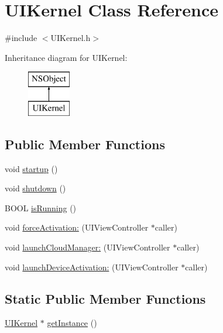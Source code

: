 \hypertarget{interface_u_i_kernel}{
\section{\-U\-I\-Kernel \-Class \-Reference}
\label{interface_u_i_kernel}
}


{\ttfamily \#include $<$\-U\-I\-Kernel.\-h$>$}

\-Inheritance diagram for \-U\-I\-Kernel\-:\begin{figure}[H]
\begin{center}
\leavevmode
\includegraphics[height=2.000000cm]{interface_u_i_kernel}
\end{center}
\end{figure}
\subsection*{\-Public \-Member \-Functions}
\begin{DoxyCompactItemize}
\item 
void \hyperlink{interface_u_i_kernel_acacf4a426cf59fae1d5c64ddf3e0eca5}{startup} ()
\item 
void \hyperlink{interface_u_i_kernel_aa87848b5862041cfe4af17fa9ea80194}{shutdown} ()
\item 
\-B\-O\-O\-L \hyperlink{interface_u_i_kernel_a12b1b335a7feb23e72621a289fcc7354}{is\-Running} ()
\item 
void \hyperlink{interface_u_i_kernel_ad06e5ea4e9b84a3301bf540d4f542b86}{force\-Activation\-:} (\-U\-I\-View\-Controller $\ast$caller)
\item 
void \hyperlink{interface_u_i_kernel_a1c79d52404091b0c5f93fc4c8a21db26}{launch\-Cloud\-Manager\-:} (\-U\-I\-View\-Controller $\ast$caller)
\item 
void \hyperlink{interface_u_i_kernel_a4159ec731bf960ac27e919e841cbceb8}{launch\-Device\-Activation\-:} (\-U\-I\-View\-Controller $\ast$caller)
\end{DoxyCompactItemize}
\subsection*{\-Static \-Public \-Member \-Functions}
\begin{DoxyCompactItemize}
\item 
\hyperlink{interface_u_i_kernel}{\-U\-I\-Kernel} $\ast$ \hyperlink{interface_u_i_kernel_a63c3e1e67f93e27d2d7d81d6328a6f70}{get\-Instance} ()
\end{DoxyCompactItemize}


